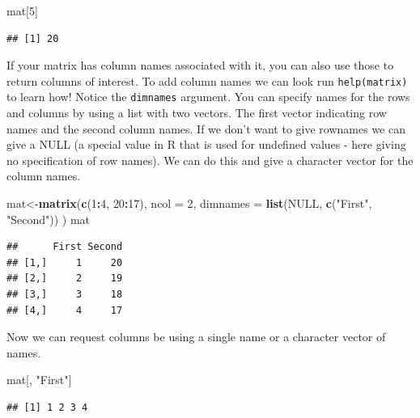 \documentclass[
]{book}
\newenvironment{Shaded}{\begin{snugshade}}{\end{snugshade}}
\newcommand{\DataTypeTok}[1]{\textcolor[rgb]{0.13,0.29,0.53}{#1}}
\newcommand{\DecValTok}[1]{\textcolor[rgb]{0.00,0.00,0.81}{#1}}
\newcommand{\KeywordTok}[1]{\textcolor[rgb]{0.13,0.29,0.53}{\textbf{#1}}}
\newcommand{\NormalTok}[1]{#1}
\newcommand{\OperatorTok}[1]{\textcolor[rgb]{0.81,0.36,0.00}{\textbf{#1}}}
\newcommand{\OtherTok}[1]{\textcolor[rgb]{0.56,0.35,0.01}{#1}}
\newcommand{\StringTok}[1]{\textcolor[rgb]{0.31,0.60,0.02}{#1}}
\theoremstyle{definition}
\theoremstyle{definition}
\theoremstyle{definition}
\theoremstyle{remark}
\begin{document}
\begin{Shaded}
\begin{Highlighting}[]
\NormalTok{mat[}\DecValTok{5}\NormalTok{]}
\end{Highlighting}
\end{Shaded}

\begin{verbatim}
## [1] 20
\end{verbatim}

If your matrix has column names associated with it, you can also use those to return columns of interest. To add column names we can look run \texttt{help(matrix)} to learn how! Notice the \texttt{dimnames} argument. You can specify names for the rows and columns by using a list with two vectors. The first vector indicating row names and the second column names. If we don't want to give rownames we can give a NULL (a special value in R that is used for undefined values - here giving no specification of row names). We can do this and give a character vector for the column names.

\begin{Shaded}
\begin{Highlighting}[]
\NormalTok{mat<-}\KeywordTok{matrix}\NormalTok{(}\KeywordTok{c}\NormalTok{(}\DecValTok{1}\OperatorTok{:}\DecValTok{4}\NormalTok{, }\DecValTok{20}\OperatorTok{:}\DecValTok{17}\NormalTok{), }\DataTypeTok{ncol =} \DecValTok{2}\NormalTok{,}
            \DataTypeTok{dimnames =} \KeywordTok{list}\NormalTok{(}\OtherTok{NULL}\NormalTok{, }\KeywordTok{c}\NormalTok{(}\StringTok{"First"}\NormalTok{, }\StringTok{"Second"}\NormalTok{))}
\NormalTok{            )}
\NormalTok{mat}
\end{Highlighting}
\end{Shaded}

\begin{verbatim}
##      First Second
## [1,]     1     20
## [2,]     2     19
## [3,]     3     18
## [4,]     4     17
\end{verbatim}

Now we can request columns be using a single name or a character vector of names.

\begin{Shaded}
\begin{Highlighting}[]
\NormalTok{mat[, }\StringTok{"First"}\NormalTok{]}
\end{Highlighting}
\end{Shaded}

\begin{verbatim}
## [1] 1 2 3 4
\end{verbatim}
\end{document}
